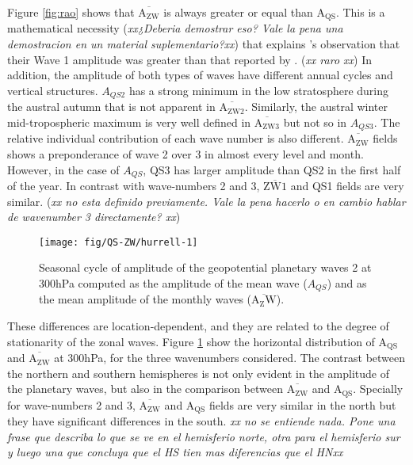 \documentclass[draft,linenumbers]{agujournal2018}
\begin{document}
Figure \ref{fig:rao} shows that \(\overline{\mathrm{A_{ZW}}}\) is always
greater or equal than \(\mathrm{A_{QS}}\). This is a mathematical
necessity (\emph{xx¿Deberia demostrar eso? Vale la pena una demostracion
en un material suplementario?xx}) that explains \citet{Rao2004}'s
observation that their Wave 1 amplitude was greater than that reported
by \citet{Hurrell1998}. (\emph{xx raro xx}) In addition, the amplitude
of both types of waves have different annual cycles and vertical
structures. \(A_{QS2}\) has a strong minimum in the low stratosphere
during the austral autumn that is not apparent in
\(\overline{\mathrm{A_{ZW2}}}\). Similarly, the austral winter
mid-tropospheric maximum is very well defined in
\(\overline{\mathrm{A_{ZW3}}}\) but not so in \(A_{QS3}\). The relative
individual contribution of each wave number is also different.
\(\overline{\mathrm{A_{ZW}}}\) fields shows a preponderance of wave 2
over 3 in almost every level and month. However, in the case of
\(A_{QS}\), QS3 has larger amplitude than QS2 in the first half of the
year. In contrast with wave-numbers 2 and 3, \(\overline{\mathrm{ZW1}}\)
and QS1 fields are very similar. (\emph{xx no esta definido previamente.
Vale la pena hacerlo o en cambio hablar de wavenumber 3 directamente?
xx})

\begin{figure}[h]

{\centering \texttt{[image: fig/QS-ZW/hurrell-1]} 

}

\caption{Seasonal cycle of amplitude of the geopotential planetary waves 2 at 300hPa computed as the amplitude of the mean wave ($A_{QS}$) and as the mean amplitude of the monthly waves ($\overline{\mathrm{A_ZW}}$).}\label{fig:hurrell}
\end{figure}

These differences are location-dependent, and they are related to the
degree of stationarity of the zonal waves. Figure \ref{fig:hurrell} show
the horizontal distribution of \(\mathrm{A_{QS}}\) and
\(\overline{\mathrm{A_{ZW}}}\) at 300hPa, for the three wavenumbers
considered. The contrast between the northern and southern hemispheres
is not only evident in the amplitude of the planetary waves, but also in
the comparison between \(\overline{\mathrm{A_{ZW}}}\) and
\(\mathrm{A_{QS}}\). Specially for wave-numbers 2 and 3,
\(\overline{\mathrm{A_{ZW}}}\) and \(\mathrm{A_{QS}}\) fields are very
similar in the north but they have significant differences in the south.
\emph{xx no se entiende nada. Pone una frase que describa lo que se ve
en el hemisferio norte, otra para el hemisferio sur y luego una que
concluya que el HS tien mas diferencias que el HNxx}
\end{document}
